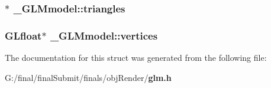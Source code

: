 \subsubsection[{triangles}]{$\ast$ \-\_\-\-G\-L\-Mmodel\-::triangles}\label{struct___g_l_mmodel_adf36c3b98e1f72f828bb5a2a1675272e}
\subsubsection[{vertices}]{\setlength{\rightskip}{0pt plus 5cm}G\-Lfloat$\ast$ \-\_\-\-G\-L\-Mmodel\-::vertices}\label{struct___g_l_mmodel_accb67311836e00c90c63e826fa58afe1}


The documentation for this struct was generated from the following file\-:\begin{DoxyCompactItemize}
\item 
G\-:/final/final\-Submit/finals/obj\-Render/{\bf glm.\-h}\end{DoxyCompactItemize}
